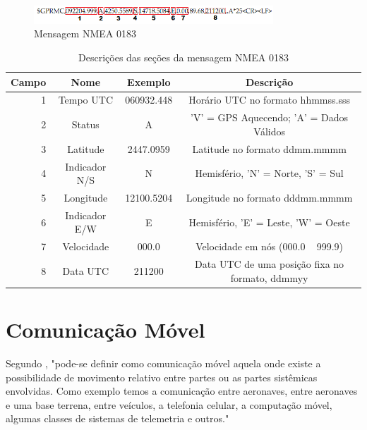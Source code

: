 \begin{figure}[h!]
			\centering
			\includegraphics[width=0.8\textwidth]{figures/gprmc.png}
			\caption{Mensagem NMEA 0183}
			\label{fig:gprmc}
\end{figure}

\begin{table}[!h]
\caption{Descrições das seções da mensagem NMEA 0183}
\centering
\begin{tabular}{|r|c|c|c|}
     \hline
		{\scriptsize \textbf{Campo}} &	{\scriptsize \textbf{Nome}} & {\scriptsize \textbf{Exemplo}} & {\scriptsize \textbf{Descrição}}\\
		\hline
		1 & {\scriptsize Tempo UTC} & {\scriptsize 060932.448} & {\scriptsize Horário UTC no formato hhmmss.sss}\\
		\hline
		2 & {\scriptsize Status} & {\scriptsize A} & {\scriptsize 'V' = GPS Aquecendo; 'A' = Dados Válidos}\\
		\hline
		3 & {\scriptsize Latitude} & {\scriptsize 2447.0959} & {\scriptsize Latitude no formato ddmm.mmmm}\\
		\hline
		4 & {\scriptsize Indicador N/S} & {\scriptsize N} & {\scriptsize Hemisfério, 'N' = Norte, 'S' = Sul}\\
		\hline
		5 & {\scriptsize Longitude} & {\scriptsize 12100.5204} & {\scriptsize Longitude no formato dddmm.mmmm} \\
		\hline
		6 & {\scriptsize Indicador E/W}  & {\scriptsize E} & {\scriptsize Hemisfério, 'E' = Leste, 'W' = Oeste} \\
		\hline
		7 & {\scriptsize Velocidade}  & {\scriptsize 000.0} & {\scriptsize Velocidade em nós (000.0 ~ 999.9)} \\
		\hline
		8 & {\scriptsize Data UTC} & {\scriptsize 211200} & {\scriptsize Data UTC de uma posição fixa no formato, ddmmyy}\\
		\hline
	\end{tabular}
\end{table}

\section {Comunicação Móvel}

Segundo \textcite{inatel:1998}, "pode-se definir como comunicação móvel aquela onde existe a possibilidade de movimento relativo entre partes ou as partes sistêmicas envolvidas. Como exemplo temos a comunicação entre aeronaves, entre aeronaves e uma base terrena, entre veículos, a telefonia celular, a computação móvel, algumas classes de sistemas de telemetria e outros."

